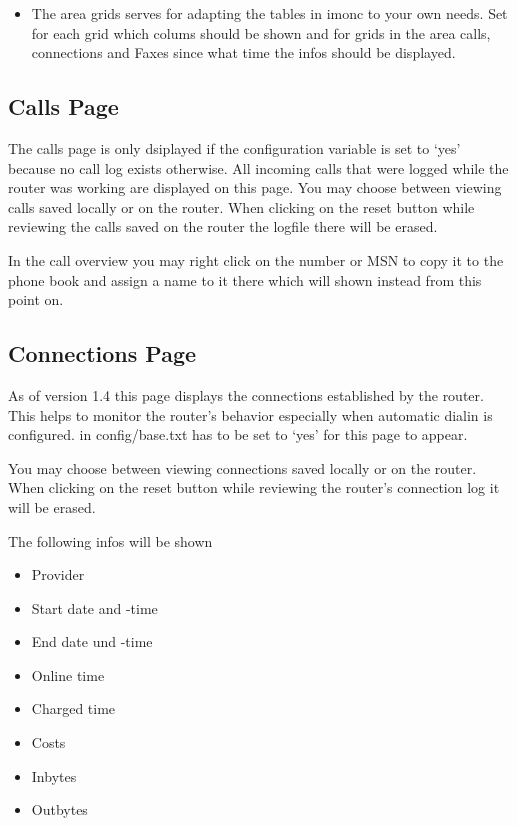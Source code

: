 \begin{itemize}
  \item The area grids serves for adapting the tables in imonc to your own needs.
    Set for each grid which colums should be shown and for grids in the area calls,
    connections and Faxes since what time the infos should be displayed.
  \end{itemize}

  \subsection{Calls Page}

  The calls page is only dsiplayed if the configuration variable
   is set to `yes' because no call log exists otherwise.
  All incoming calls that were logged while the router was working are
  displayed on this page. You may choose between viewing calls saved
  locally or on the router. When clicking on the reset button while
  reviewing the calls saved on the router the logfile there will be erased.

  In the call overview you may right click on the number or MSN to copy
  it to the phone book and assign a name to it there which will shown instead
  from this point on.

  \subsection{Connections Page}

  As of version 1.4 this page displays the connections established by the router.
  This helps to monitor the router's behavior especially when automatic
  dialin is configured.  in config/base.txt has to be
  set to `yes' for this page to appear.

  You may choose between viewing connections saved locally or on the router.
  When clicking on the reset button while reviewing the router's connection log
  it will be erased.

  The following infos will be shown
  \begin{itemize}
  \item Provider
  \item Start date and -time
  \item End date und -time
  \item Online time
  \item Charged time
  \item Costs
  \item Inbytes
  \item Outbytes
  \end{itemize}


